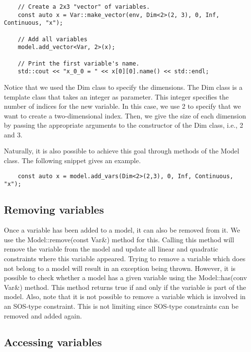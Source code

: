 \begin{lstlisting}
    // Create a 2x3 "vector" of variables.
    const auto x = Var::make_vector(env, Dim<2>(2, 3), 0, Inf, Continuous, "x");

    // Add all variables
    model.add_vector<Var, 2>(x);

    // Print the first variable's name.
    std::cout << "x_0_0 = " << x[0][0].name() << std::endl;
\end{lstlisting}

Notice that we used the \textsf{Dim} class to specify the dimensions. The
\textsf{Dim} class is a template class that takes an integer as parameter.
This integer specifies the number of indices for the new variable. In this
case, we use 2 to specify that we want to create a two-dimensional index.
Then, we give the size of each dimension by passing the appropriate arguments
to the constructor of the \textsf{Dim} class, i.e., 2 and 3. 

Naturally, it is also possible to achieve this goal through methods of the
\textsf{Model} class. The following snippet gives an example.

\begin{lstlisting}
    const auto x = model.add_vars(Dim<2>(2,3), 0, Inf, Continuous, "x");
\end{lstlisting}

\subsection{Removing variables}

Once a variable has been added to a model, it can also be removed from it. We
use the \textsf{Model::remove(const Var\&)} method for this. Calling this
method will remove the variable from the model and update all linear and
quadratic constraints where this variable appeared. Trying to remove a
variable which does not belong to a model will result in an exception being
thrown. However, it is possible to check whether a model has a given variable
using the \textsf{Model::has(conv Var\&)} method. This method returns true if
and only if the variable is part of the model. Also, note that it is not
possible to remove a variable which is involved in an SOS-type constraint.
This is not limiting since SOS-type constraints can be removed and added
again.

\subsection{Accessing variables}

